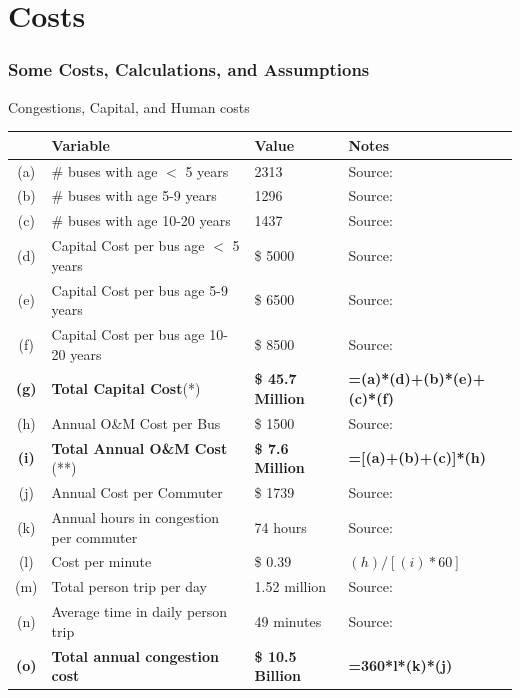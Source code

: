 \documentclass{beamer}
\begin{document}
\section{Costs}
\begin{frame}
  \frametitle{Some Costs,  Calculations, and Assumptions}
  \begin{block}{Congestions, Capital, and Human costs}
    \begin{table}[h]
      \centering
      \tiny
      \begin{tabular}{c l l l}
        \hline
 	& Variable & Value & Notes \\\hline\hline
        (a)& \# buses with age $<$ 5 years& 2313& Source: \cite{am1}\\
(b)	& \# buses with age 5-9 years				& 1296				& Source:	\cite{am1}					\\
(c)	& \# buses with age 10-20 years			& 1437				& Source:	\cite{am1}					\\
(d)	& Capital Cost per bus age $<$ 5 years		& \$ 5000				& Source:	\cite{am1}		\\
(e)	& Capital Cost per bus age 5-9 years		& \$ 6500				& Source:	\cite{am1}		\\
(f)	& Capital Cost per bus age 10-20 years		& \$ 8500				& Source:	\cite{am1}		\\
\textbf{(g)}	& \textbf{Total Capital Cost}(*)			& \textbf{\$ 45.7 Million}	& \textbf{=(a)*(d)+(b)*(e)+(c)*(f)}			\\
(h)	& Annual O\&M Cost per Bus				& \$ 1500				& Source:	\cite{am1}	\\
\textbf{(i)}	& \textbf{Total Annual O\&M Cost} (**)	& \textbf{\$
  7.6 Million}	& \textbf{=[(a)+(b)+(c)]*(h)}\\
(j)	& Annual Cost per Commuter				& \$ 1739				& Source:	\cite{UMR}	\\
(k)	& Annual hours in congestion per commuter	& 74 hours			& Source:	\cite{UMR} 	\\
(l)	& Cost per minute 						& \$ 0.39				& $(h)/[(i)*60]$		\\
(m)	& Total person trip per day					& 1.52 million			& Source: 	\cite{nyctransit}	\\
(n)	& Average time in daily person trip			& 49 minutes			& Source:	\cite{nyctransit}	\\
\textbf{(o)}	& \textbf{Total annual congestion cost}	& \textbf{\$
  10.5 Billion}	& \textbf{=360*l*(k)*(j)}\\

\end{tabular}
\end{table}
\end{block}
\end{frame}
\end{document}

